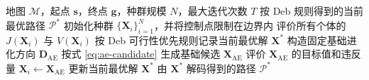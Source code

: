 \begin{algorithm}[H]
\caption{基础 AE 路径搜索流程}
\label{alg:base-ae}
\scriptsize
\begin{algorithmic}[1]
\Require 地图 $\mathcal{M}$，起点 $\mathbf{s}$，终点 $\mathbf{g}$，种群规模 $N$，最大迭代次数 $T$
    \Ensure 按 Deb 规则得到的当前最优路径 $\mathcal{P}^*$
\State 初始化种群 $\{\mathbf{X}_i\}_{i=1}^{N}$，并将控制点限制在边界内
\State 评价所有个体的 $J(\mathbf{X}_i)$ 与 $V(\mathbf{X}_i)$
\State 按 Deb 可行性优先规则记录当前最优解 $\mathbf{X}^*$
        \State 构造固定基础进化方向 $\mathbf{D}_{\mathrm{AE}}$
        \State 按式 \eqref{eq:ae-candidate} 生成基础候选 $\mathbf{X}_{\mathrm{AE}}$
        \State 评价 $\mathbf{X}_{\mathrm{AE}}$ 的目标值和违反量
            \State $\mathbf{X}_i\gets \mathbf{X}_{\mathrm{AE}}$
        \EndIf
        \State 更新当前最优解 $\mathbf{X}^*$
    \EndFor
\EndFor
\State \Return 由 $\mathbf{X}^*$ 解码得到的路径 $\mathcal{P}^*$
\end{algorithmic}
\end{algorithm}

